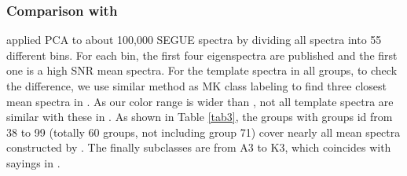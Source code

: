 \documentclass[referee]{raa}            %
\begin{document}
\subsubsection{Comparison with \cite{mcgurk2010principal}}
\cite{mcgurk2010principal} applied PCA  to about 100,000 SEGUE spectra by dividing all spectra into 55 different bins.
For each bin, the first four eigenspectra are published and the first one is a high SNR mean spectra.
For the template spectra in all groups, to check the difference, we use similar method as MK class labeling to  find three closest mean spectra in \cite{mcgurk2010principal}.
As our  color range is wider than \cite{mcgurk2010principal}, not all template spectra are similar with these in  \cite{mcgurk2010principal}.
As shown in Table \ref{tab3}, the groups with groups id from 38 to 99 (totally 60 groups, not including group 71) cover nearly all mean spectra constructed by \cite{mcgurk2010principal}.
The finally subclasses are from A3 to K3, which coincides with sayings in \cite{mcgurk2010principal}.
\end{document}
